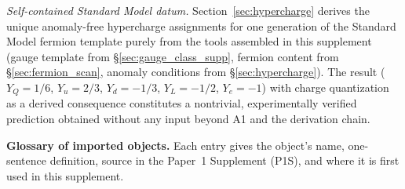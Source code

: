 \documentclass[11pt,a4paper]{article}
\theoremstyle{definition}
\begin{document}
\smallskip\noindent\textit{Self-contained Standard Model datum.}\quad
Section~\ref{sec:hypercharge} derives the unique anomaly-free hypercharge
assignments for one generation of the Standard Model fermion template
purely from the tools assembled in this supplement (gauge template from
\S\ref{sec:gauge_class_supp}, fermion content from \S\ref{sec:fermion_scan},
anomaly conditions from \S\ref{sec:hypercharge}).  The result
($Y_Q = 1/6$, $Y_u = 2/3$, $Y_d = -1/3$, $Y_L = -1/2$, $Y_e = -1$)
with charge quantization as a derived consequence constitutes a
nontrivial, experimentally verified prediction obtained without any
input beyond A1 and the derivation chain.

\medskip\noindent\textbf{Glossary of imported objects.}  Each entry gives the object's name, one-sentence definition, source in the Paper~1 Supplement (P1S), and where it is first used in this supplement.
\end{document}
